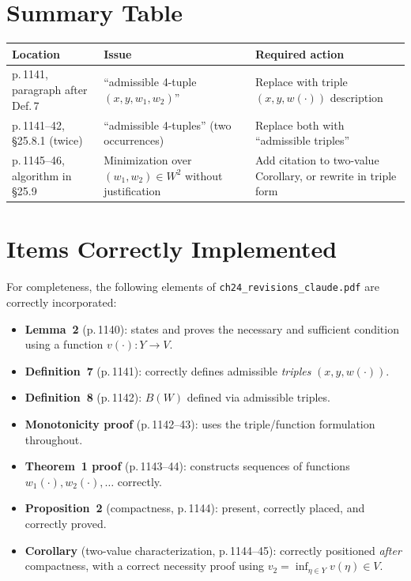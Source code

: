 \documentclass[12pt]{article}
\begin{document}
\section{Summary Table}

\begin{center}
\begin{tabular}{llp{6cm}}
\toprule
\textbf{Location} & \textbf{Issue} & \textbf{Required action} \\
\midrule
p.\,1141, paragraph after Def.\,7
  & ``admissible 4-tuple $(x,y,w_1,w_2)$''
  & Replace with triple $(x,y,w(\cdot))$ description \\[4pt]
p.\,1141--42, \S25.8.1 (twice)
  & ``admissible 4-tuples'' (two occurrences)
  & Replace both with ``admissible triples'' \\[4pt]
p.\,1145--46, algorithm in \S25.9
  & Minimization over $(w_1,w_2)\in W^2$ without justification
  & Add citation to two-value Corollary, or rewrite in triple form \\
\bottomrule
\end{tabular}
\end{center}

\section{Items Correctly Implemented}

For completeness, the following elements of
\texttt{ch24\_revisions\_claude.pdf} are correctly incorporated:

\begin{itemize}
\item \textbf{Lemma~2} (p.\,1140): states and proves the necessary and
  sufficient condition using a function $v(\cdot):Y\to V$.
\item \textbf{Definition~7} (p.\,1141): correctly defines admissible
  \emph{triples} $(x,y,w(\cdot))$.
\item \textbf{Definition~8} (p.\,1142): $B(W)$ defined via admissible
  triples.
\item \textbf{Monotonicity proof} (p.\,1142--43): uses the
  triple/function formulation throughout.
\item \textbf{Theorem~1 proof} (p.\,1143--44): constructs sequences of
  functions $w_1(\cdot),w_2(\cdot),\ldots$ correctly.
\item \textbf{Proposition~2} (compactness, p.\,1144): present, correctly
  placed, and correctly proved.
\item \textbf{Corollary} (two-value characterization, p.\,1144--45):
  correctly positioned \emph{after} compactness, with a correct
  necessity proof using $v_2=\inf_{\eta\in Y}v(\eta)\in V$.
\end{itemize}
\end{document}
